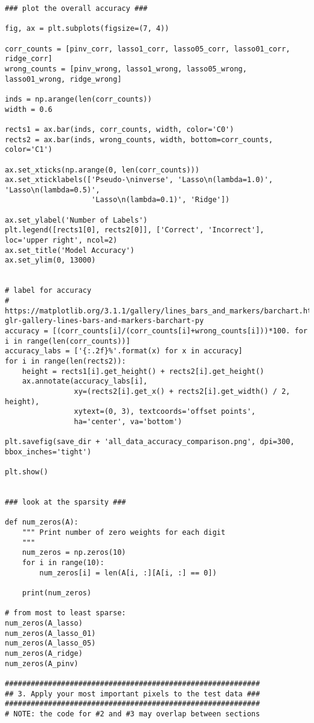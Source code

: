 \documentclass[10pt]{article}
\begin{document}
\begin{lstlisting}
### plot the overall accuracy ### 

fig, ax = plt.subplots(figsize=(7, 4))

corr_counts = [pinv_corr, lasso1_corr, lasso05_corr, lasso01_corr, ridge_corr]
wrong_counts = [pinv_wrong, lasso1_wrong, lasso05_wrong, lasso01_wrong, ridge_wrong]

inds = np.arange(len(corr_counts))
width = 0.6

rects1 = ax.bar(inds, corr_counts, width, color='C0')
rects2 = ax.bar(inds, wrong_counts, width, bottom=corr_counts, color='C1')

ax.set_xticks(np.arange(0, len(corr_counts)))
ax.set_xticklabels(['Pseudo-\ninverse', 'Lasso\n(lambda=1.0)', 'Lasso\n(lambda=0.5)',
                    'Lasso\n(lambda=0.1)', 'Ridge'])

ax.set_ylabel('Number of Labels')
plt.legend([rects1[0], rects2[0]], ['Correct', 'Incorrect'], loc='upper right', ncol=2)
ax.set_title('Model Accuracy')
ax.set_ylim(0, 13000)


# label for accuracy
# https://matplotlib.org/3.1.1/gallery/lines_bars_and_markers/barchart.html#sphx-glr-gallery-lines-bars-and-markers-barchart-py
accuracy = [(corr_counts[i]/(corr_counts[i]+wrong_counts[i]))*100. for i in range(len(corr_counts))]
accuracy_labs = ['{:.2f}%'.format(x) for x in accuracy]
for i in range(len(rects2)):
    height = rects1[i].get_height() + rects2[i].get_height()
    ax.annotate(accuracy_labs[i],
                xy=(rects2[i].get_x() + rects2[i].get_width() / 2, height),
                xytext=(0, 3), textcoords='offset points',
                ha='center', va='bottom')

plt.savefig(save_dir + 'all_data_accuracy_comparison.png', dpi=300, bbox_inches='tight')

plt.show()


### look at the sparsity ###

def num_zeros(A):
    """ Print number of zero weights for each digit
    """
    num_zeros = np.zeros(10)
    for i in range(10):
        num_zeros[i] = len(A[i, :][A[i, :] == 0])
    
    print(num_zeros)
    
# from most to least sparse:
num_zeros(A_lasso)
num_zeros(A_lasso_01)
num_zeros(A_lasso_05)
num_zeros(A_ridge)
num_zeros(A_pinv)

###########################################################
## 3. Apply your most important pixels to the test data ###
###########################################################
# NOTE: the code for #2 and #3 may overlap between sections


\end{lstlisting}
\end{document}
